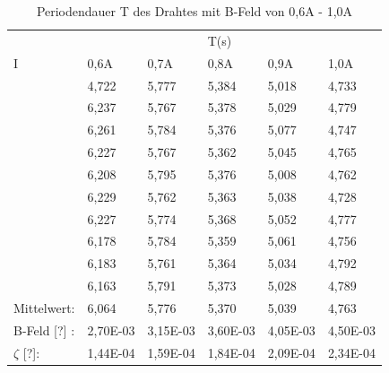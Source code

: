 \begin{table}[h!]
    \centering
    \caption{Periodendauer T des Drahtes mit B-Feld von 0,6A - 1,0A}
    \begin{tabular}{p{3cm} | p{1.5cm} p{1.5cm} p{1.5cm} p{1.5cm} p{1.5cm}}
      &      &      & T(s) &      &     \\
    I & 0,6A & 0,7A & 0,8A & 0,9A & 1,0A\\
    \midrule
    & 4,722 &  5,777 &  5,384 &  5,018 &  4,733\\
    & 6,237 &  5,767 &  5,378 &  5,029 &  4,779\\
    & 6,261 &  5,784 &  5,376 &  5,077 &  4,747\\
    & 6,227 &  5,767 &  5,362 &  5,045 &  4,765\\
    & 6,208 &  5,795 &  5,376 &  5,008 &  4,762\\
    & 6,229 &  5,762 &  5,363 &  5,038 &  4,728\\
    & 6,227 &  5,774 &  5,368 &  5,052 &  4,777\\
    & 6,178 &  5,784 &  5,359 &  5,061 &  4,756\\
    & 6,183 &  5,761 &  5,364 &  5,034 &  4,792\\
    & 6,163 &  5,791 &  5,373 &  5,028 &  4,789\\
    \midrule
    Mittelwert:    & 6,064 & 5,776 & 5,370 & 5,039 &  4,763 \\
    \midrule
    B-Feld [?] : & 2,70E-03 & 3,15E-03 & 3,60E-03 & 4,05E-03 & 4,50E-03 \\      
    $\zeta$ [?]: & 1,44E-04 & 1,59E-04 & 1,84E-04 & 2,09E-04 & 2,34E-04\\
    \bottomrule
    \end{tabular}
    \label{tab:tabelle_06A}
\end{table}

\label{sec:Auswertung}
